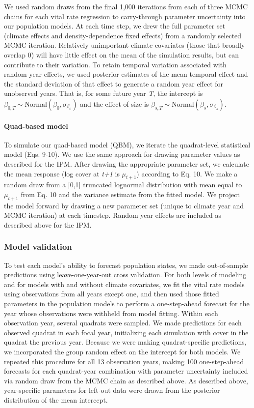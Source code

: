 \documentclass[12pt,]{article}
\begin{document}
We used random draws from the final 1,000 iterations from each of three
MCMC chains for each vital rate regression to carry-through parameter
uncertainty into our population models. At each time step, we drew the
full parameter set (climate effects and density-dependence fixed
effects) from a randomly selected MCMC iteration. Relatively unimportant
climate covariates (those that broadly overlap 0) will have little
effect on the mean of the simulation results, but can contribute to
their variation. To retain temporal variation associated with random
year effects, we used posterior estimates of the mean temporal effect
and the standard deviation of that effect to generate a random year
effect for unobserved years. That is, for some future year \emph{T}, the
intercept is
\(\beta_{0,T} \sim \text{Normal}(\beta_0, \sigma_{\beta_0})\) and the
effect of size is
\(\beta_{s,T} \sim \text{Normal}(\beta_s, \sigma_{\beta_s})\).

\paragraph{Quad-based model}\label{quad-based-model}

To simulate our quad-based model (QBM), we iterate the quadrat-level
statistical model (Eqs. 9-10). We use the same approach for drawing
parameter values as described for the IPM. After drawing the appropriate
parameter set, we calculate the mean response (log cover at \emph{t+1}
is \(\mu_{t+1}\)) according to Eq. 10. We make a random draw from a
{[}0,1{]} truncated lognormal distribution with mean equal to
\(\mu_{t+1}\) from Eq. 10 and the variance estimate from the fitted
model. We project the model forward by drawing a new parameter set
(unique to climate year and MCMC iteration) at each timestep. Random
year effects are included as described above for the IPM.

\subsubsection{Model validation}\label{model-validation}

To test each model's ability to forecast population states, we made
out-of-sample predictions using leave-one-year-out cross validation. For
both levels of modeling and for models with and without climate
covariates, we fit the vital rate models using observations from all
years except one, and then used those fitted parameters in the
population models to perform a one-step-ahead forecast for the year
whose observations were withheld from model fitting. Within each
observation year, several quadrats were sampled. We made predictions for
each observed quadrat in each focal year, initializing each simulation
with cover in the quadrat the previous year. Because we were making
quadrat-specific predictions, we incorporated the group random effect on
the intercept for both models. We repeated this procedure for all 13
observation years, making 100 one-step-ahead forecasts for each
quadrat-year combination with parameter uncertainty included via random
draw from the MCMC chain as described above. As described above,
year-specific parameters for left-out data were drawn from the posterior
distribution of the mean intercept.
\end{document}
